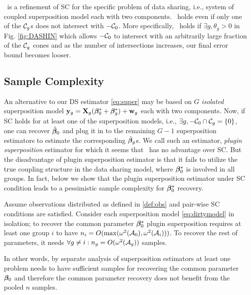 

\begin{remark}
	\ds\ is a refinement of SC for the specific problem of data sharing, i.e., system of coupled superposition model each with two components. \ds\ holds even if only one of the $\cC_g$s does not intersect with $-\cC_0$. More specifically, \ds\ holds if $\exists g, \theta_g > 0$ in Fig. \ref{fig:DASHIN} which allows $-\cC_0$ to intersect with an arbitrarily large fraction of the $\cC_g$ cones and as the number of intersections increases, our final error bound becomes looser.
\end{remark}

\subsection{Sample Complexity}
An alternative to our DS estimator \eqref{eq:super} may be based on $G$ \emph{isolated} superposition model $\mathbf{y}_g = \mathbf{X}_g (\boldsymbol{\beta} _0^* + \boldsymbol{\beta} _g^*) + \mathbf{w}_g$ each with two components. Now, if SC holds for at least one of the superposition models, i.e., $\exists g, -\cC_0 \cap \cC_g = \{0 \}$, one can recover $\hat{\boldsymbol{\beta}}_0$ and plug it in to the remaining $G-1$ superposition estimators to estimate the corresponding $\hat{\boldsymbol{\beta}}_g$s. We call such an estimator, \emph{plugin superposition} estimator for which it seems that \ds\ has no advantage over SC. But the disadvantage of plugin superposition estimator is that it fails to utilize the true coupling structure in the data sharing model, where $\boldsymbol{\beta}^*_0$ is involved in all groups. In fact, below we show that the plugin superposition estimator under SC condition leads to a pessimistic sample complexity for $\boldsymbol{\beta}^*_0$ recovery.
\begin{prop}
	\label{prop:super}
	Assume observations distributed as defined in \ref{def:obs} and pair-wise SC conditions are satisfied.  Consider each superposition model \eqref{eq:dirtymodel} in isolation; to recover the common parameter $\boldsymbol{\beta} _0^*$ plugin superposition requires at least one group $i$ to have $n_i = O(\max(\omega^2(\cA_0), \omega^2(\cA_i)))$. 
	To recover the rest of parameters, it needs $\forall g \neq i: n_g = O(\omega^2(\cA_g))$ samples. 
\end{prop}
In other words, by separate analysis of superposition estimators at least one problem needs to have sufficient samples for recovering the common parameter $\boldsymbol{\beta}_0$ and therefore the common parameter recovery does not benefit from the pooled $n$ samples.
